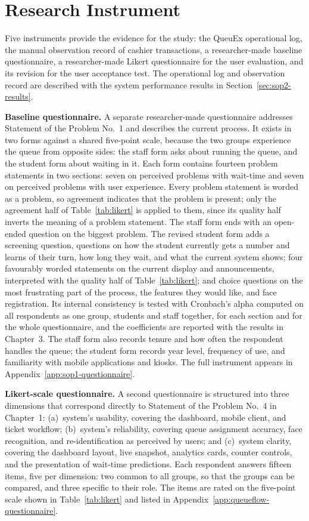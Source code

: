 \documentclass{research}
\newcommand{\sysname}{QueuEx}
\begin{document}
\section{Research Instrument}
\label{sec:instrument}

Five instruments provide the evidence for the study: the \sysname{}
operational log, the manual observation record of cashier transactions,
a researcher-made baseline questionnaire, a researcher-made Likert
questionnaire for the user evaluation, and its revision for the user
acceptance test. The operational log and
observation record are described with the system performance results in
Section~\ref{sec:sop2-results}.

\textbf{Baseline questionnaire.} A separate researcher-made
questionnaire addresses Statement of the Problem No.~1 and describes
the current process. It exists in two forms against a shared five-point
scale, because the two groups experience the queue from opposite sides:
the staff form asks about running the queue, and the student form about
waiting in it. Each form contains fourteen problem statements in two
sections: seven on perceived problems with wait-time and seven on
perceived problems with user experience. Every problem statement is
worded as a problem, so agreement indicates that the problem is present;
only the agreement half of Table~\ref{tab:likert} is applied to them,
since its quality half inverts the meaning of a problem statement. The
staff form ends with an open-ended question on the biggest problem. The
revised student form adds a screening question, questions on how the
student currently gets a number and learns of their turn, how long they
wait, and what the current system shows; four favourably worded
statements on the current display and announcements, interpreted with
the quality half of Table~\ref{tab:likert}; and choice questions on the
most frustrating part of the process, the features they would like, and
face registration. Its
internal consistency is tested with Cronbach's alpha computed on all
respondents as one group, students and staff together, for each section
and for the whole questionnaire, and the coefficients are reported with
the results in Chapter~3. The staff form also records tenure and how often the respondent handles the
queue; the student form records year level, frequency of use, and
familiarity with mobile applications and kiosks. The
full instrument appears in Appendix~\ref{app:sop1-questionnaire}.

\textbf{Likert-scale questionnaire.} A second questionnaire is
structured into three dimensions that correspond directly to Statement
of the Problem No.~4 in Chapter~1: (a)~system's usability, covering the
dashboard, mobile client, and ticket workflow; (b)~system's
reliability, covering queue assignment accuracy, face recognition,
and re-identification as perceived by users; and (c)~system clarity,
covering the dashboard layout, live snapshot, analytics cards, counter
controls, and the presentation of wait-time predictions. Each respondent
answers fifteen items, five per dimension: two common to all groups, so
that the groups can be compared, and three specific to their role. The
items are rated on the five-point scale shown in Table~\ref{tab:likert}
and listed in Appendix~\ref{app:queueflow-questionnaire}.
\end{document}
